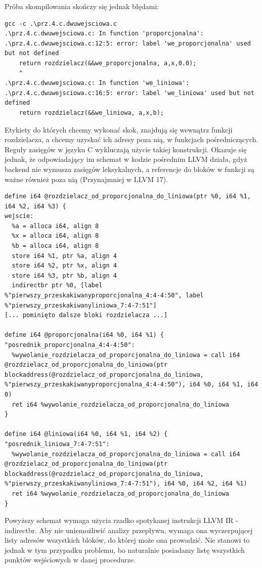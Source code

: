 Próba skompilowania skończy się jednak błędami:
\begin{lstlisting}
gcc -c .\prz.4.c.dwuwejsciowa.c
.\prz.4.c.dwuwejsciowa.c: In function 'proporcjonalna':
.\prz.4.c.dwuwejsciowa.c:12:5: error: label 'we_proporcjonalna' used but not defined
 	return rozdzielacz(&&we_proporcjonalna, a,x,0.0);
 	^
.\prz.4.c.dwuwejsciowa.c: In function 'we_liniowa':
.\prz.4.c.dwuwejsciowa.c:16:5: error: label 'we_liniowa' used but not defined
 	return rozdzielacz(&&we_liniowa, a,x,b);
\end{lstlisting}
Etykiety do których chcemy wykonać skok, znajdują się wewnątrz funkcji rozdzielacza, a chcemy uzyskać ich adresy poza nią,  w funkcjach pośredniczących. Reguły zasięgów w języku C wykluczają użycie takiej konstrukcji. Okazuje się jednak, że odpowiadający im schemat w kodzie pośrednim LLVM działa, gdyż backend nie wymusza zasięgów leksykalnych, a referencje do bloków w funkcji są ważne również poza nią (Przynajmniej w LLVM 17).
\begin{lstlisting}
define i64 @rozdzielacz_od_proporcjonalna_do_liniowa(ptr %0, i64 %1, i64 %2, i64 %3) {
wejscie:
  %a = alloca i64, align 8
  %x = alloca i64, align 8
  %b = alloca i64, align 8
  store i64 %1, ptr %a, align 4
  store i64 %2, ptr %x, align 4
  store i64 %3, ptr %b, align 4
  indirectbr ptr %0, [label %"pierwszy_przeskakiwanyproporcjonalna_4:4-4:50", label %"pierwszy_przeskakiwanyliniowa_7:4-7:51"]
[... pominięto dalsze bloki rozdzielacza ...]

define i64 @proporcjonalna(i64 %0, i64 %1) {
"posrednik_proporcjonalna_4:4-4:50":
  %wywolanie_rozdzielacza_od_proporcjonalna_do_liniowa = call i64 @rozdzielacz_od_proporcjonalna_do_liniowa(ptr blockaddress(@rozdzielacz_od_proporcjonalna_do_liniowa, %"pierwszy_przeskakiwanyproporcjonalna_4:4-4:50"), i64 %0, i64 %1, i64 0)
  ret i64 %wywolanie_rozdzielacza_od_proporcjonalna_do_liniowa
}

define i64 @liniowa(i64 %0, i64 %1, i64 %2) {
"posrednik_liniowa_7:4-7:51":
  %wywolanie_rozdzielacza_od_proporcjonalna_do_liniowa = call i64 @rozdzielacz_od_proporcjonalna_do_liniowa(ptr blockaddress(@rozdzielacz_od_proporcjonalna_do_liniowa, %"pierwszy_przeskakiwanyliniowa_7:4-7:51"), i64 %0, i64 %2, i64 %1)
  ret i64 %wywolanie_rozdzielacza_od_proporcjonalna_do_liniowa
}
\end{lstlisting}
Powyższy schemat wymaga użycia rzadko spotykanej instrukcji LLVM IR - indirectbr. Aby nie uniemożliwić analizy przepływu, wymaga ona wyczerpującej listy adresów wszystkich bloków, do której może ona prowadzić. Nie stanowi to jednak w tym przypadku problemu, bo naturalnie posiadamy listę wszystkich punktów wejściowych w danej procedurze.

